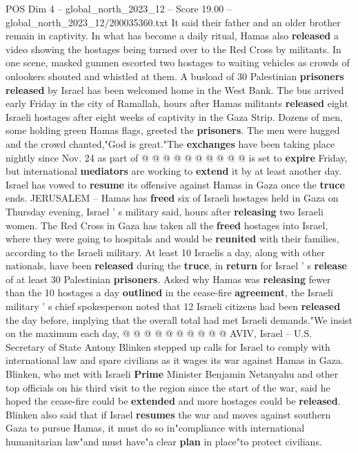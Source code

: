 \begin{textsample}{POS Dim 4 – global\_north\_2023\_12 – Score 19.00 – global\_north\_2023\_12/200035360.txt}
It said their father and an older brother remain in captivity.
In what has become a daily ritual, Hamas also \textbf{released} a video showing the hostages being turned over to the Red Cross by militants.
In one scene, masked gunmen escorted two hostages to waiting vehicles as crowds of onlookers shouted and whistled at them.
A busload of 30 Palestinian \textbf{prisoners} \textbf{released} by Israel has been welcomed home in the West Bank.
The bus arrived early Friday in the city of Ramallah, hours after Hamas militants \textbf{released} eight Israeli hostages after eight weeks of captivity in the Gaza Strip.
Dozens of men, some holding green Hamas flags, greeted the \textbf{prisoners}.
The men were hugged and the crowd chanted,"God is great."The \textbf{exchanges} have been taking place nightly since Nov. 24 as part of @ @ @ @ @ @ @ @ @ @ is set to \textbf{expire} Friday, but international \textbf{mediators} are working to \textbf{extend} it by at least another day.
Israel has vowed to \textbf{resume} its offensive against Hamas in Gaza once the \textbf{truce} ends.
JERUSALEM -- Hamas has \textbf{freed} six of Israeli hostages held in Gaza on Thursday evening, Israel ' s military said, hours after \textbf{releasing} two Israeli women.
The Red Cross in Gaza has taken all the \textbf{freed} hostages into Israel, where they were going to hospitals and would be \textbf{reunited} with their families, according to the Israeli military.
At least 10 Israelis a day, along with other nationals, have been \textbf{released} during the \textbf{truce}, in \textbf{return} for Israel ' s \textbf{release} of at least 30 Palestinian \textbf{prisoners}.
Asked why Hamas was \textbf{releasing} fewer than the 10 hostages a day \textbf{outlined} in the cease-fire \textbf{agreement}, the Israeli military ' s chief spokesperson noted that 12 Israeli citizens had been \textbf{released} the day before, implying that the overall total had met Israeli demands."We insist on the maximum each day, @ @ @ @ @ @ @ @ @ @ AVIV, Israel -- U.S.
Secretary of State Antony Blinken stepped up calls for Israel to comply with international law and spare civilians as it wages its war against Hamas in Gaza.
Blinken, who met with Israeli \textbf{Prime} Minister Benjamin Netanyahu and other top officials on his third visit to the region since the start of the war, said he hoped the cease-fire could be \textbf{extended} and more hostages could be \textbf{released}.
Blinken also said that if Israel \textbf{resumes} the war and moves against southern Gaza to pursue Hamas, it must do so in"compliance with international humanitarian law"and must have"a clear \textbf{plan} in place"to protect civilians.

\end{textsample}
